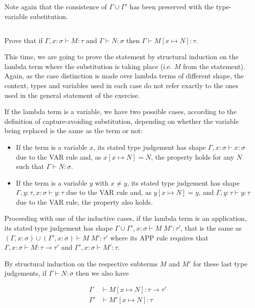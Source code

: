 \documentclass{article}
\begin{document}
Note again that the consistence of $\Gamma \cup \Gamma'$ has been 
preserved with the type-variable substitution.

\subsection{}\label{ex:6}

Prove that if $\Gamma, x: \sigma \vdash M: \tau$ and 
$\Gamma \vdash N: \sigma$ then 
$\Gamma \vdash M[x \mapsto N]: \tau$.

This time, we are going to prove the statement by structural
induction on the lambda term where the substitution is
taking place (i.e. $M$ from the statement). 
Again, as the case distinction is made
over lambda terms of different shape, the context, types and variables 
used in each case do not refer exactly to the ones used in the general 
statement of the exercise.

If the lambda term is a variable, we have two possible 
cases, according to the definition of capture-avoiding substitution, 
depending on whether the variable being replaced is the same as the 
term or not:

\begin{itemize}
  \item If the term is a variable $x$, its stated type judgement 
    has shape $\Gamma, x: \sigma \vdash x: \sigma$ due to the VAR 
    rule and, as $x[x \mapsto N] = N$, the property holds for any 
    $N$ such that $\Gamma \vdash N: \sigma$.
  \item If the term is a variable $y$ with $x \neq y$, its stated 
    type judgement has shape $\Gamma, y: \tau, x: \sigma \vdash y: \tau$ 
    due to the VAR rule and, as $y[x \mapsto N] = y$, 
    and $\Gamma, y: \tau \vdash y: \tau$ due to the VAR rule, the 
    property also holds.
\end{itemize}

Proceeding with one of the inductive cases, if the lambda term is 
an application, its stated type judgement has shape 
$\Gamma \cup \Gamma', x: \sigma \vdash M\;M': \tau'$,
that is the same as $(\Gamma, x: \sigma) \cup (\Gamma', x: \sigma) 
\vdash M\;M': \tau'$
where its APP rule requires that
$\Gamma, x: \sigma \vdash M : \tau \rightarrow \tau'$ and 
$\Gamma', x: \sigma \vdash M': \tau$.

By structural induction on the respective subterms $M$ and $M'$
for these last type judgements, if $\Gamma \vdash N: \sigma$ then 
we also have

\begin{align*}
  \Gamma
  &\vdash M[x \mapsto N] : \tau \rightarrow \tau' \\
  \Gamma' &\vdash M'[x \mapsto N]: \tau
\end{align*}
\end{document}
